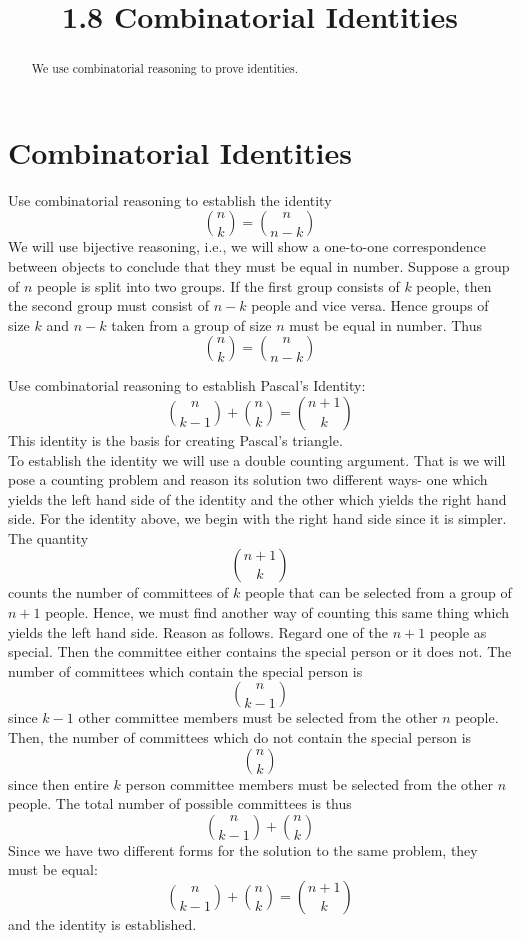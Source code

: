 \documentclass[handout]{ximera}
\title{1.8 Combinatorial Identities}
\begin{document}
\begin{abstract}
We use combinatorial reasoning to prove identities.
\end{abstract}

\maketitle

\section{Combinatorial Identities}

\begin{example}[example 1]
Use combinatorial reasoning to establish the identity
\[
\binom{n}{k}  = \binom{n}{n-k}
\]
We will use bijective reasoning, i.e., we will show a one-to-one correspondence between objects to 
conclude that they must be equal in number.
Suppose a group of $n$ people is split into two groups. If the first group consists of $k$ people, 
then the second group must consist of $n-k$ people and vice versa.
 Hence groups of size $k$ and $n-k$ taken from a group of size $n$ must be equal in number. Thus
\[
\binom{n}{k}  = \binom{n}{n-k}
\]
\end{example}



\begin{example}[example 2]
Use combinatorial reasoning to establish Pascal's Identity:
\[
\binom{n}{k-1} + \binom{n}{k} = \binom{n+1}{k}
\]
This identity is the basis for creating Pascal's triangle.\\
To establish the identity we will use a double counting argument. 
That is we will pose a counting problem and reason its 
solution two different ways- one which yields the left hand side of the identity and the other which
 yields the right hand side. For the identity above, we begin with the right hand 
 side since it is simpler.  The quantity
 \[
 \binom{n+1}{k}
 \]
 counts the number of committees of $k$ people that can be selected from a group of $n+1$ people. 
 Hence, we must find another way of counting this same thing which yields the left hand side. 
 Reason as follows. Regard one of the $n+1$ people as special. 
 Then the committee either contains the special person or it does not.
 The number of committees which contain the special person is 
 \[
 \binom{n}{k-1}
 \]
 since $k-1$ other committee members must be selected from the other $n$ people.
 Then, the number of committees which do not contain the special person is 
 \[
 \binom{n}{k}
 \]
 since then entire $k$ person committee members must be selected from the other $n$ people.
 The total number of possible committees is thus
 \[
\binom{n}{k-1} + \binom{n}{k}
\]
Since we have two different forms for the solution to the same problem, they must be equal:
\[
\binom{n}{k-1} + \binom{n}{k} = \binom{n+1}{k}
\]
and the identity is established.
\end{example}
\end{document}
